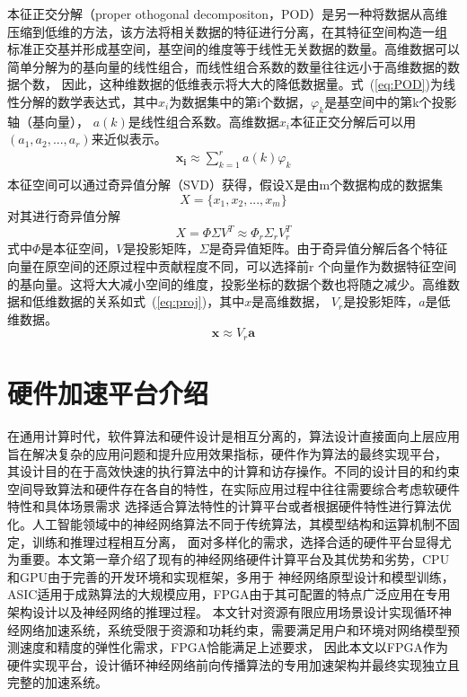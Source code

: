 本征正交分解（proper othogonal decompositon，POD）是另一种将数据从高维压缩到低维的方法，该方法将相关数据的特征进行分离，在其特征空间构造一组
标准正交基并形成基空间，基空间的维度等于线性无关数据的数量。高维数据可以简单分解为的基向量的线性组合，而线性组合系数的数量往往远小于高维数据的数据个数，
因此，这种维数据的低维表示将大大的降低数据量。式~(\ref{eq:POD})为线性分解的数学表达式，其中\(x_i\)为数据集中的第i个数据，\(\varphi _k\)是基空间中的第k个投影轴（基向量），
\(a(k)\)是线性组合系数。高维数据\(x_i\)本征正交分解后可以用\((a_1,a_2,...,a_r)\)来近似表示。
\begin{equation}\label{eq:POD}
	\begin{split}
		\mathbf{x_i} \approx \sum_{k=1}^{r}a(k) \varphi _k		\\
	\end{split}
\end{equation}
本征空间可以通过奇异值分解（SVD）获得，假设X是由m个数据构成的数据集
\begin{equation}
	X = \{x_1,x_2,...,x_m\}
\end{equation}
对其进行奇异值分解
\begin{equation}
	X = \Phi   \Sigma  V^T \approx \Phi _r  \Sigma _r  V_r^T
\end{equation}
式中\(\Phi\)是本征空间，\(V\)是投影矩阵，\(\Sigma\)是奇异值矩阵。由于奇异值分解后各个特征向量在原空间的还原过程中贡献程度不同，可以选择前r
个向量作为数据特征空间的基向量。这将大大减小空间的维度，投影坐标的数据个数也将随之减少。高维数据和低维数据的关系如式~(\ref{eq:proj})，其中\(x\)是高维数据，
\(V_r\)是投影矩阵，\(a\)是低维数据。
\begin{equation}\label{eq:proj}
	\mathbf{x} \approx V_r  \mathbf{a}
\end{equation}

\section{硬件加速平台介绍}
在通用计算时代，软件算法和硬件设计是相互分离的，算法设计直接面向上层应用旨在解决复杂的应用问题和提升应用效果指标，硬件作为算法的最终实现平台，
其设计目的在于高效快速的执行算法中的计算和访存操作。不同的设计目的和约束空间导致算法和硬件存在各自的特性，在实际应用过程中往往需要综合考虑软硬件特性和具体场景需求
选择适合算法特性的计算平台或者根据硬件特性进行算法优化。人工智能领域中的神经网络算法不同于传统算法，其模型结构和运算机制不固定，训练和推理过程相互分离，
面对多样化的需求，选择合适的硬件平台显得尤为重要。本文第一章介绍了现有的神经网络硬件计算平台及其优势和劣势，CPU和GPU由于完善的开发环境和实现框架，多用于
神经网络原型设计和模型训练，ASIC适用于成熟算法的大规模应用，FPGA由于其可配置的特点广泛应用在专用架构设计以及神经网络的推理过程。
本文针对资源有限应用场景设计实现循环神经网络加速系统，系统受限于资源和功耗约束，需要满足用户和环境对网络模型预测速度和精度的弹性化需求，FPGA恰能满足上述要求，
因此本文以FPGA作为硬件实现平台，设计循环神经网络前向传播算法的专用加速架构并最终实现独立且完整的加速系统。

